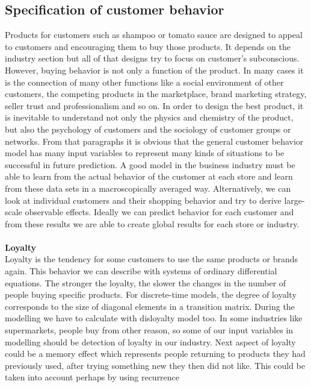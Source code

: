 \subsection{Specification of customer behavior} \label{subsec:specification}
Products for customers such as shampoo or tomato sauce are designed to appeal to customers and encouraging them to buy those products.
It depends on the industry section but all of that designs try to focus on customer’s subconscious.
However, buying behavior is not only a function of the product.
In many cases it is the connection of many other functions like a social environment of other customers, the competing products in the marketplace,
brand marketing strategy, seller trust and professionalism and so on.
In order to design the best product, it is inevitable to understand not only the physics and chemistry of the product,
but also the psychology of customers and the sociology of customer groups or networks\cite{patel}.
From that paragraphs it is obvious that the general customer behavior model has many input variables to represent many
kinds of situations to be successful in future prediction.
A good model in the business industry must be able to learn from the actual behavior of the customer at each store and learn from these data sets in a macroscopically averaged way.
Alternatively, we can look at individual customers and their shopping behavior and try to derive large-scale observable effects.
Ideally we can predict behavior for each customer and from these results we are able to create global results for each store or industry.\\
\\
\textbf{Loyalty} \label{subsec:loyalty}\\
Loyalty is the tendency for some customers to use the same products or brands again.
This behavior we can describe with systems of ordinary differential equations.
The stronger the loyalty, the slower the changes in the number of people buying specific products.
For discrete-time models, the degree of loyalty corresponds to the size of diagonal elements in a transition matrix.
During the modelling we have to calculate with  disloyalty model too.
In some industries like supermarkets,
people buy from other reason, so some of our input variables in modelling should be detection of loyalty in our industry.
Next aspect of loyalty could be a memory effect which represents people returning to products they had previously used,
after trying something new they then did not like.
This could be taken into account perhaps by using recurrence
